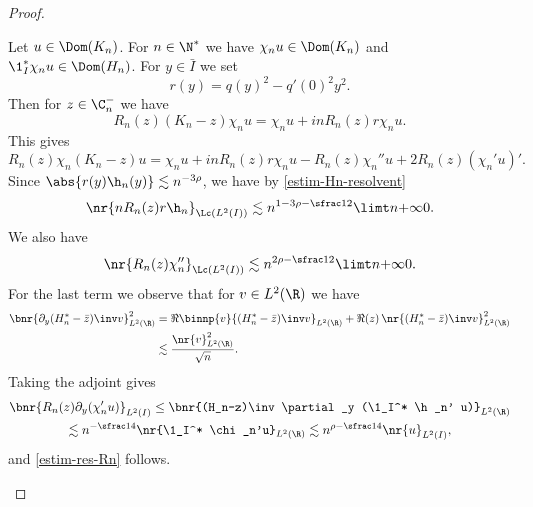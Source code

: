 \begin{proof}
\begin{itemize}
Let $u \in \Dom(K_n)$. For $n \in \N^*$ we have $\chi_n u \in \Dom(K_n)$ and $\1_I^* \chi_n u \in \Dom(H_n)$. For $y \in \bar I$ we set
\[
r(y) = q(y)^2 - q'(0)^2 y^2.
\]
Then for $z \in \C_n^-$ we have
\[
R_n(z) (K_n-z) \chi_n u = \chi_n u + i n R_n(z) r \chi_n u.
\]
This gives
\begin{equation} \label{eq-K-Rn}
R_n(z) \chi_n (K_n-z) u = \chi_n u + i n R_n(z) r \chi_n u - R_n(z) \chi_n'' u + 2 R_n(z) (\chi_n' u)'.
\end{equation}
Since $\abs{r(y) \h_n(y)} \lesssim n^{-3\rho}$, we have by \eqref{estim-Hn-resolvent}
\begin{equation*}
\nr{n R_n(z) r \h_n}_{\Lc(L^2(I))} \lesssim n^{1 - 3\rho - \sfrac 12} \limt n {+\infty} 0.
\end{equation*}
We also have
\[
\nr{R_n(z) \chi_n''}_{\Lc(L^2(I))} \lesssim n^{2\rho - \sfrac 12} \limt n {+\infty} 0.
\]
For the last term we observe that for $v \in L^2(\R)$ we have
\begin{align*}
\bnr{\partial_y (H_n^*-\bar z)\inv v}_{L^2(\R)}^2
& = \Re \binnp{v}{(H_n^*-\bar z)\inv v}_{L^2(\R)} + \Re(z)\, \nr{(H_n^*-\bar z)\inv v}_{L^2(\R)}^2\\
& \lesssim \frac {\nr{v}_{L^2(\R)}^2}{\sqrt n}.
\end{align*}
Taking the adjoint gives
\begin{multline*}
\bnr{R_n(z) \partial_y (\chi_n' u)}_{L^2(I)} \leq \bnr{(H_n-z)\inv \partial_y (\1_I^* \h_n' u)}_{L^2(\R)}\\
\lesssim n^{-\sfrac 14} \nr{\1_I^* \chi_n'u}_{L^2(\R)} \lesssim n^{\rho-\sfrac 14} \nr{u}_{L^2(I)},
\end{multline*}
and \eqref{estim-res-Rn} follows.


\end{itemize}
\end{proof}
